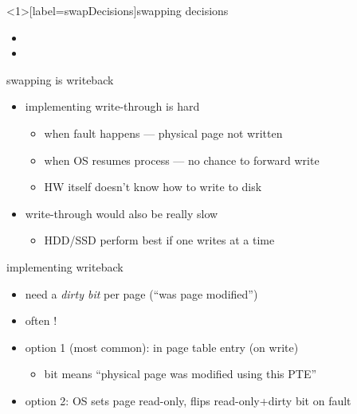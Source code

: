 
\begin{frame}<1>[label=swapDecisions]{swapping decisions}
\begin{itemize}
\item {}
\item {}
\end{itemize}
\end{frame}


\begin{frame}{swapping is writeback}
\begin{itemize}
\item implementing write-through is hard
\begin{itemize}
    \item when fault happens --- physical page not written
    \item when OS resumes process --- no chance to forward write
    \item HW itself doesn't know how to write to disk
\end{itemize}
\item write-through would also be really slow
\begin{itemize}
    \item HDD/SSD perform best if one writes  at a time
\end{itemize}
\end{itemize}
\end{frame}

\begin{frame}{implementing writeback}
\begin{itemize}
\item need a \textit{dirty bit} per page (``was page modified'')
\item often !
\vspace{.5cm}
\item option 1 (most common):  in page table entry (on write)
    \begin{itemize}
        \item bit means ``physical page was modified using this PTE''
    \end{itemize}
\item option 2: OS sets page read-only, flips read-only+dirty bit on fault
\end{itemize}
\end{frame}

